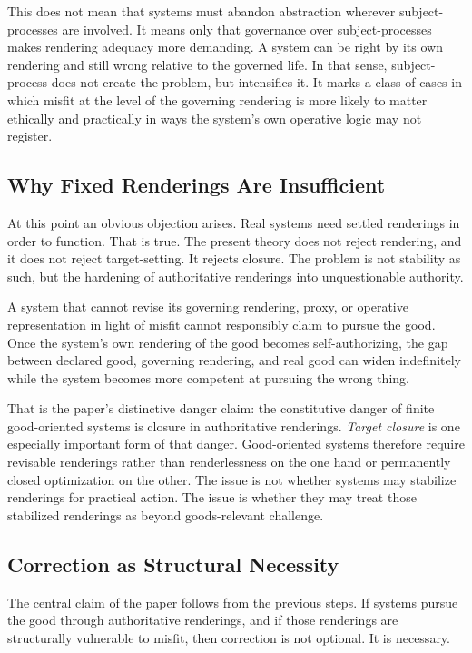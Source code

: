 \documentclass[11pt]{article}
\renewcommand{\emph}[1]{\textit{#1}}
\begin{document}
This does not mean that systems must abandon abstraction wherever subject-processes are involved. It means only that governance over subject-processes makes rendering adequacy more demanding. A system can be right by its own rendering and still wrong relative to the governed life. In that sense, subject-process does not create the problem, but intensifies it. It marks a class of cases in which misfit at the level of the governing rendering is more likely to matter ethically and practically in ways the system's own operative logic may not register.

\subsection{Why Fixed Renderings Are Insufficient}

At this point an obvious objection arises. Real systems need settled renderings in order to function. That is true. The present theory does not reject rendering, and it does not reject target-setting. It rejects closure. The problem is not stability as such, but the hardening of authoritative renderings into unquestionable authority.

A system that cannot revise its governing rendering, proxy, or operative representation in light of misfit cannot responsibly claim to pursue the good. Once the system's own rendering of the good becomes self-authorizing, the gap between declared good, governing rendering, and real good can widen indefinitely while the system becomes more competent at pursuing the wrong thing.

That is the paper's distinctive danger claim: the constitutive danger of finite good-oriented systems is closure in authoritative renderings. \emph{Target closure} is one especially important form of that danger. Good-oriented systems therefore require revisable renderings rather than renderlessness on the one hand or permanently closed optimization on the other. The issue is not whether systems may stabilize renderings for practical action. The issue is whether they may treat those stabilized renderings as beyond goods-relevant challenge.

\subsection{Correction as Structural Necessity}

The central claim of the paper follows from the previous steps. If systems pursue the good through authoritative renderings, and if those renderings are structurally vulnerable to misfit, then correction is not optional. It is necessary.
\end{document}
